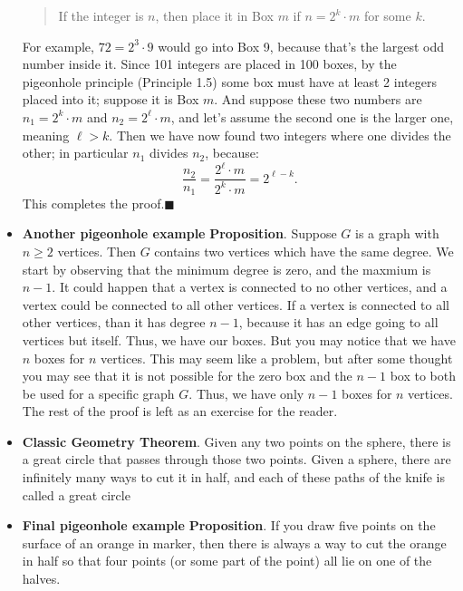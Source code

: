 \documentclass{report}
\begin{document}
\begin{itemize}
\begin{quote}
                If the integer is $n$, then place it in Box $m$ if $n = 2^k \cdot m$ for some $k$.
            \end{quote}
            \bigbreak \noindent 
            For example, $72 = 2^3 \cdot 9$ would go into Box 9, because that's the largest odd number inside it.
            \bigbreak \noindent 
            Since 101 integers are placed in 100 boxes, by the pigeonhole principle (Principle 1.5) some box must have at least 2 integers placed into it; suppose it is Box $m$. And suppose these two numbers are $n_1 = 2^k \cdot m$ and $n_2 = 2^\ell \cdot m$, and let’s assume the second one is the larger one, meaning $\ell > k$. Then we have now found two integers where one divides the other; in particular $n_1$ divides $n_2$, because:
            \[
                \frac{n_2}{n_1} = \frac{2^\ell \cdot m}{2^k \cdot m} = 2^{\ell - k}.
            \]
            This completes the proof.$\blacksquare$
        \item \textbf{Another pigeonhole example}
            \bigbreak \noindent 
            \textbf{Proposition}. Suppose $G$ is a graph with $n \geq 2$ vertices. Then $G$ contains two vertices which have the same degree.
            \bigbreak \noindent 
            We start by observing that the minimum degree is zero, and the maxmium is $n-1$. It could happen that a vertex is connected to no other vertices, and a vertex could be connected to all other vertices. If a vertex is connected to all other vertices, than it has degree $n-1$, because it has an edge going to all vertices but itself. Thus, we have our boxes. But you may notice that we have $n$ boxes for $n$ vertices. This may seem like a problem, but after some thought you may see that it is not possible for the zero box and the $n-1$ box to both be used for a specific graph $G$. Thus, we have only $n-1$ boxes for $n$ vertices.
            \bigbreak \noindent 
            The rest of the proof is left as an exercise for the reader.
        \item \textbf{Classic Geometry Theorem}. Given any two points on the sphere, there is a great circle that passes through those two points. 
            \bigbreak \noindent 
            Given a sphere, there are infinitely many ways to cut it in half, and each of these paths of the knife is called a great circle
            \bigbreak \noindent 
        \item \textbf{Final pigeonhole example}
            \bigbreak \noindent 
            \textbf{Proposition}. If you draw five points on the surface of an orange in marker, then there is always a way to cut the orange in half so that four points (or some part of the point) all lie on one of the halves.

\end{itemize}
\end{document}
